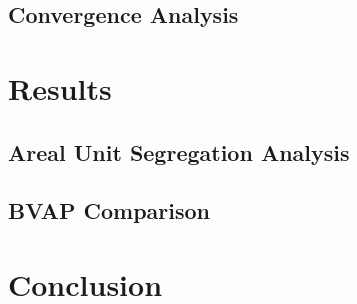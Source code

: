 \documentclass{article}
\begin{document}
\subsection{Convergence Analysis}\label{convergence}

\section{Results}\label{results}

\subsection{Areal Unit Segregation Analysis}

\subsection{BVAP Comparison}

\section{Conclusion}
\end{document}
